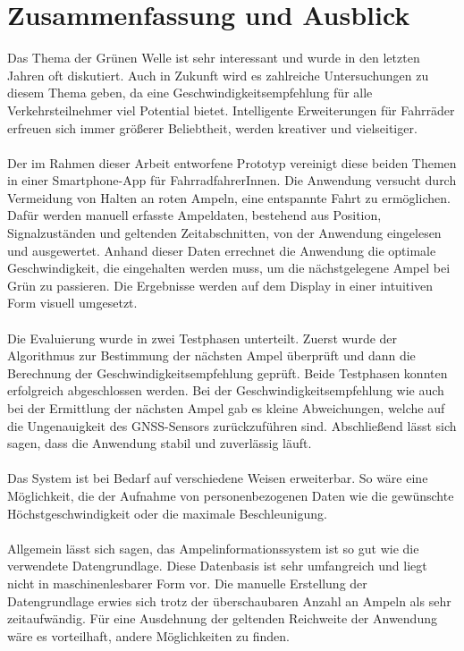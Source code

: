 \chapter{\label{chap:fazit}Zusammenfassung und Ausblick}
Das Thema der Grünen Welle ist sehr interessant und wurde in den letzten Jahren oft diskutiert. Auch in Zukunft wird es zahlreiche Untersuchungen zu diesem Thema geben, da eine Geschwindigkeitsempfehlung für alle Verkehrsteilnehmer viel Potential bietet. Intelligente Erweiterungen für Fahrräder erfreuen sich immer größerer Beliebtheit, werden kreativer und vielseitiger.\\\\
Der im Rahmen dieser Arbeit entworfene Prototyp vereinigt diese beiden Themen in einer \gls{Smartphone}-\gls{App} für FahrradfahrerInnen. Die Anwendung versucht durch Vermeidung von Halten an roten Ampeln, eine entspannte Fahrt zu ermöglichen. Dafür werden manuell erfasste Ampeldaten, bestehend aus Position, Signalzuständen und geltenden Zeitabschnitten, von der Anwendung eingelesen und ausgewertet. Anhand dieser Daten errechnet die Anwendung die optimale Geschwindigkeit, die eingehalten werden muss, um die nächstgelegene Ampel bei Grün zu passieren. Die Ergebnisse werden auf dem Display in einer intuitiven Form visuell umgesetzt.\\\\ 
Die Evaluierung wurde in zwei Testphasen unterteilt. Zuerst wurde der Algorithmus zur Bestimmung der nächsten Ampel überprüft und dann die Berechnung der Geschwindigkeitsempfehlung geprüft. Beide Testphasen konnten erfolgreich abgeschlossen werden. Bei der Geschwindigkeitsempfehlung wie auch bei der Ermittlung der nächsten Ampel gab es kleine Abweichungen, welche auf die Ungenauigkeit des \gls{GNSS}-Sensors zurückzuführen sind. Abschließend lässt sich sagen, dass die Anwendung stabil und zuverlässig läuft.\\\\
%
%
Das System ist bei Bedarf auf verschiedene Weisen erweiterbar. So wäre eine Möglichkeit, die der Aufnahme von personenbezogenen Daten wie die gewünschte Höchstgeschwindigkeit oder die maximale Beschleunigung.\\\\
Allgemein lässt sich sagen, das Ampelinformationssystem ist so gut wie die verwendete Datengrundlage. Diese Datenbasis ist sehr umfangreich und liegt nicht in maschinenlesbarer Form vor.
Die manuelle Erstellung der Datengrundlage erwies sich trotz der überschaubaren Anzahl an Ampeln als sehr zeitaufwändig. Für eine Ausdehnung der geltenden Reichweite der Anwendung wäre es vorteilhaft, andere Möglichkeiten zu finden.\\ 
